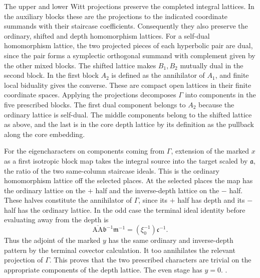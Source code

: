 The upper and lower Witt projections preserve the
completed integral lattices. In the auxiliary blocks
these are the projections to the indicated coordinate
summands with their staircase coefficients. Consequently
they also preserve the ordinary, shifted and depth
homomorphism lattices. For a self-dual homomorphism
lattice, the two projected pieces of each hyperbolic
pair are dual, since the pair forms a symplectic
orthogonal summand with complement given by the
other mixed blocks. The shifted lattice makes
\(B_1,B_2\) mutually dual in
the second block. In the first block \(A_2\) is defined as
the annihilator of \(A_1\), and finite local biduality gives
the converse. These are compact open lattices in their
finite coordinate spaces. Applying the projections
decomposes \(\Gamma\) into components in the five
prescribed blocks. The first dual component belongs to
\(A_2\) because the ordinary lattice is self-dual.
The middle components belong to the shifted lattice as
above, and the last is in the core depth lattice by its
definition as the pullback along the core embedding.

For the eigencharacters on components coming from
\(\Gamma\), extension of the marked \(x\) as a first
isotropic block map takes the integral source into the
target scaled by \(\mathfrak a\), the ratio of the two
same-column staircase ideals. This is the ordinary
homomorphism lattice off the selected places. At the
selected places the map has the ordinary lattice on
the \(+\) half and the inverse-depth lattice on the
\(-\) half. These halves constitute the annihilator
of \(\Gamma\), since its \(+\) half has depth and its
\(-\) half has the ordinary lattice. In the odd case
the terminal ideal identity before evaluating away
from the depth is
\[
 \overline{\mathrm{AA}}\mathfrak b^{-1}\mathfrak m^{-1}
       =(\xi_0^{-1})\mathfrak c^{-1}.
\]
Thus the adjoint of the marked \(y\) has the same
ordinary and inverse-depth pattern by the terminal
covector calculation. It too annihilates the relevant
projection of \(\Gamma\). This proves that the two
prescribed characters are trivial on the appropriate
components of the depth lattice. The even stage has
\(y=0\).
.

